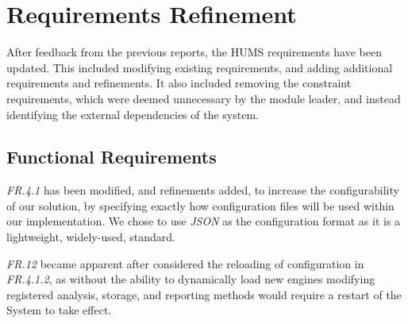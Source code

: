 \documentclass[10pt,a4paper]{article}
\begin{document}
\section{Requirements Refinement}
\label{sec:requirements}
After feedback from the previous reports, the HUMS requirements have been updated. This included modifying existing requirements, and adding additional requirements and refinements. It also included removing the constraint requirements, which were deemed unnecessary by the module leader, and instead identifying the external dependencies of the system.

\subsection{Functional Requirements}
\label{sec:functional_requirements}

\emph{FR.4.1} has been modified, and refinements added, to increase the configurability of our solution, by specifying exactly how configuration files will be used within our implementation. We chose to use \emph{JSON} as the configuration format as it is a lightweight, widely-used, standard.

\emph{FR.12} became apparent after considered the reloading of configuration in \emph{FR.4.1.2}, as without the ability to dynamically load new engines modifying registered analysis, storage, and reporting methods would require a restart of the System to take effect.
\end{document}
